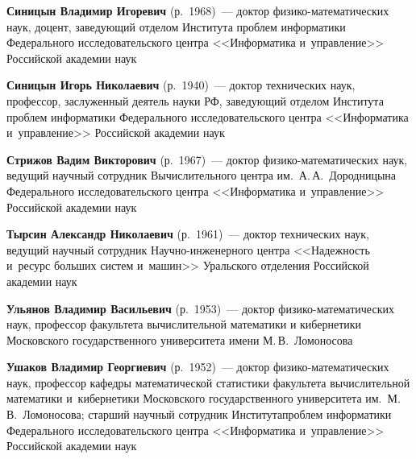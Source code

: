 \begin{multicols}{2}
\vspace*{3pt}

  \noindent
\textbf{Синицын Владимир Игоревич} (р.\ 1968)~--- 
доктор фи\-зи\-ко-ма\-те\-ма\-ти\-че\-ских наук, доцент, 
заведующий отделом Института проб\-лем информатики
Федерального исследовательского центра
<<Информатика и~управ\-ле\-ние>> Российской академии наук


\vspace*{3pt}

\noindent
  \textbf{Синицын Игорь Николаевич} (р.\ 1940)~--- доктор технических наук,
  профессор, заслуженный деятель науки РФ, заведующий отделом Института
  проб\-лем информатики Федерального исследовательского центра
  <<Информатика и~управ\-ле\-ние>> Российской академии наук

\vspace*{3pt}

\noindent
\textbf{Стрижов Вадим Викторович} (р.\ 1967)~---
 доктор фи\-зи\-ко-ма\-те\-ма\-ти\-че\-ских наук, ведущий научный сотрудник 
 Вычислительного центра им.\ А.\,А.~Дородницына Федерального исследовательского центра 
 <<Информатика и~управ\-ле\-ние>> Российской академии наук

\pagebreak

\noindent
\textbf{Тырсин Александр Николаевич} (р.\ 1961)~---
 доктор технических наук, ведущий научный сотрудник На\-уч\-но-ин\-же\-нер\-но\-го 
 центра <<Надежность и~ресурс больших систем и~машин>> Уральского отделения
 Российской академии наук %

\vspace*{3pt}


\noindent
\textbf{Ульянов Владимир Васильевич} (р.\ 1953)~---
доктор фи\-зи\-ко-ма\-те\-ма\-ти\-че\-ских наук, профессор факультета 
вычислительной математики и кибернетики Московского государственного 
университета имени М.\,В.~Ломоносова

\vspace*{3pt}

\noindent
\textbf{Ушаков Владимир Георгиевич} (р.\ 1952)~---
доктор фи\-зи\-ко-ма\-те\-ма\-ти\-че\-ских наук, профессор кафедры 
математической статистики факультета вычислительной математики и~кибернетики 
Московского государственного университета им.\ М.\,В.~Ломоносова;
старший научный сотрудник Института\linebreak проб\-лем информатики Федерального 
исследовательского центра <<Информатика и~управ\-ле\-ние>> Российской академии наук


\end{multicols}
